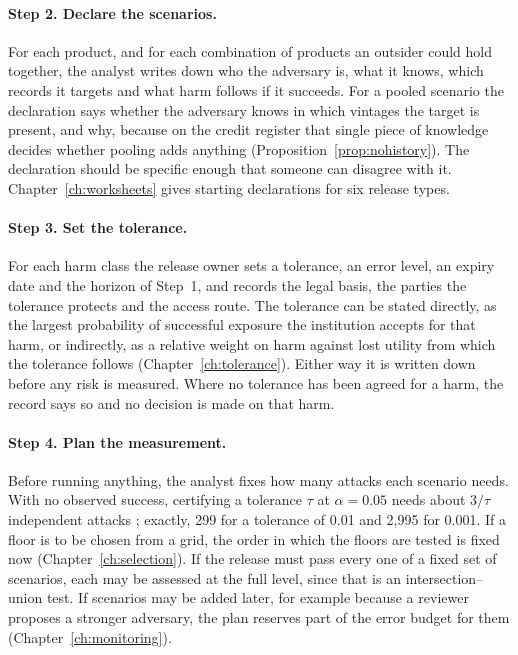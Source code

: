 \paragraph{Step 2. Declare the scenarios.} For each product, and for each
combination of products an outsider could hold together, the analyst writes down who
the adversary is, what it knows, which records it targets and what harm follows if it
succeeds. For a pooled scenario the declaration says whether the adversary knows in
which vintages the target is present, and why, because on the credit register that
single piece of knowledge decides whether pooling adds anything
(Proposition~\ref{prop:nohistory}). The declaration should be specific enough that
someone can disagree with it. Chapter~\ref{ch:worksheets} gives starting declarations
for six release types.

\paragraph{Step 3. Set the tolerance.} For each harm class the release owner sets a
tolerance, an error level, an expiry date and the horizon of Step~1, and records the
legal basis, the parties the tolerance protects and the access route. The tolerance
can be stated directly, as the largest probability of successful exposure the
institution accepts for that harm, or indirectly, as a relative weight on harm
against lost utility from which the tolerance follows
(Chapter~\ref{ch:tolerance}). Either way it is written down before any risk is
measured. Where no tolerance has been agreed for a harm, the record says so and no
decision is made on that harm.

\paragraph{Step 4. Plan the measurement.} Before running anything, the analyst fixes
how many attacks each scenario needs. With no observed success, certifying a
tolerance $\tau$ at $\alpha = 0.05$ needs about $3/\tau$ independent attacks
\citep{hanley1983}; exactly, 299 for a tolerance of 0.01 and 2{,}995 for 0.001.
If a floor is to be chosen from a grid, the order in which the floors are tested is
fixed now (Chapter~\ref{ch:selection}). If the release must pass every one of a fixed
set of scenarios, each may be assessed at the full level, since that is an
intersection--union test. If scenarios may be added later, for example because a
reviewer proposes a stronger adversary, the plan reserves part of the error budget
for them (Chapter~\ref{ch:monitoring}).

